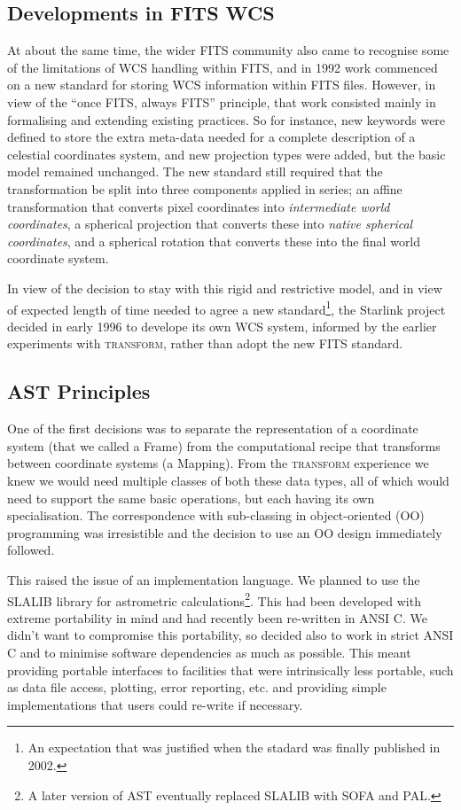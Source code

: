 \documentclass[final,authoryear,5p,times,twocolumn]{elsarticle}
\begin{document}
\subsection{Developments in FITS WCS}

At about the same time, the wider FITS community also came to recognise
some of the limitations of WCS handling within FITS, and in 1992 work commenced 
on a new standard for storing WCS information within FITS files. However, 
in view of the ``once FITS, always FITS'' principle, that work consisted 
mainly in formalising and extending existing practices. So for instance, new 
keywords were defined to store the extra meta-data needed for a complete
description of a celestial coordinates system, and new projection types were 
added, but the basic model remained unchanged. The new standard still required 
that the transformation be split into three components applied in series; an 
affine transformation that converts pixel coordinates into \emph{intermediate 
world coordinates}, a spherical projection that converts these into \emph{native 
spherical coordinates}, and a spherical rotation that converts these into the
final world coordinate system.

In view of the decision to stay with this rigid and restrictive model,
and in view of expected length of time needed to agree a new standard\footnote{An
expectation that was justified when the stadard was finally published in 2002.},
the Starlink project decided in early 1996 to develope its own WCS system, informed 
by the earlier experiments with \textsc{transform}, rather than adopt the new FITS 
standard.

\subsection{AST Principles}

One of the first decisions was to
separate the representation of a coordinate system (that we called a
Frame) from the computational recipe that transforms between
coordinate systems (a Mapping). From the \textsc{transform} experience
we knew we would need multiple classes of both these data types, all
of which would need to support the same basic operations, but each
having its own specialisation. The correspondence with sub-classing in
object-oriented (OO) programming was irresistible and the decision to
use an OO design immediately followed.

This raised the issue of an implementation language. We planned to use
the SLALIB library for astrometric calculations\footnote{A later version 
of AST eventually replaced SLALIB with SOFA and PAL.}. This had been
developed with extreme portability in mind and had recently been
re-written in ANSI C. We didn't want to compromise this portability,
so decided also to work in strict ANSI C and to minimise software
dependencies as much as possible. This meant providing portable
interfaces to facilities that were intrinsically less portable, such
as data file access, plotting, error reporting, etc. and providing
simple implementations that users could re-write if necessary.
\end{document}

